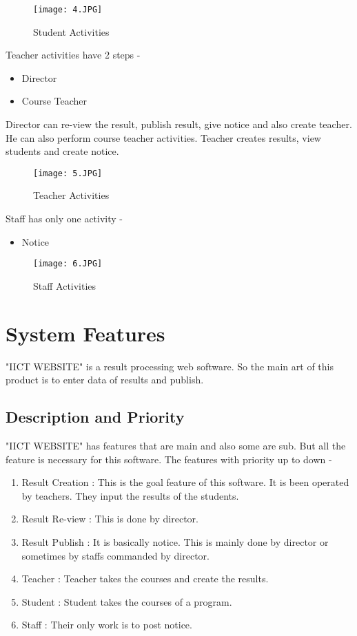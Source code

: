 \documentclass{scrreprt}
\begin{document}
\begin{figure}[h!]
    \centering
    \texttt{[image: 4.JPG]}
    \caption{Student Activities}
    \label{fig:Students Activites}
\end{figure}
\newpage
Teacher activities have 2 steps - 
\begin{itemize}
    \item Director
    \item Course Teacher
\end{itemize}
Director can re-view the result, publish result, give notice and also create teacher. He can also perform course teacher activities.
\newline
Teacher creates results, view students and create notice.
\newline
\begin{figure}[h!]
    \centering
    \texttt{[image: 5.JPG]}
    \caption{Teacher Activities}
    \label{fig:Teacher Activities}
\end{figure}
\newline
Staff has only one activity - 
\begin{itemize}
    \item Notice
\end{itemize} 
\begin{figure}[h!]
    \centering
    \texttt{[image: 6.JPG]}
    \caption{Staff Activities}
    \label{fig:Staff Activities}
\end{figure}

\chapter{System Features}
"IICT WEBSITE" is a result processing web software. So the main art of this product is to enter data of results and publish. 

\section{Description and Priority}
"IICT WEBSITE" has features that are main and also some are sub. But all the feature is necessary for this software.
\newline
The features with priority up to down - 
\begin{enumerate}
    \item Result Creation : This is the goal feature of this software. It is been operated by teachers. They input the results of the students.
    \item Result Re-view : This is done by director.
    \item Result Publish : It is basically notice. This is mainly done by director or sometimes by staffs commanded by director.
    \item Teacher : Teacher takes the courses and create the results.
    \item Student : Student takes the courses of a program.
    \item Staff : Their only work is to post notice.
\end{enumerate}
\end{document}
